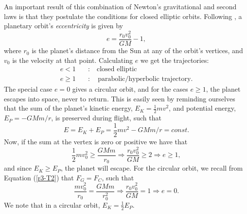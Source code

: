 \documentclass[]{article}
\begin{document}
An important result of this combination of Newton's gravitational and second laws is that they postulate the conditions for closed elliptic orbits. Following \cite{hibbeler2001}, a planetary orbit's \textit{eccentricity} is given by
\begin{equation}
	e = \frac{r_0 v_0^2}{GM} - 1,
\end{equation}
where $r_0$ is the planet's distance from the Sun at any of the orbit's vertices, and $v_0$ is the velocity at that point. Calculating $e$ we get the trajectories:
\begin{equation}
\begin{aligned}
	e < 1 \quad &: \quad \text{closed elliptic} \\
	e \ge 1 \quad &: \quad \text{parabolic/hyperbolic trajectory}.
\end{aligned}
\end{equation}
The special case $e=0$ gives a circular orbit, and for the cases $e \ge 1$, the planet escapes into space, never to return. This is easily seen by reminding ourselves that the sum of the planet's kinetic energy, $E_K=\frac{1}{2}mv^2$, and potential energy, $E_P=-GMm/r$, is preserved during flight, such that
\begin{equation}
E = E_K + E_P = \frac{1}{2}mv^2 - GMm/r = const.
\end{equation}
Now, if the sum at the vertex is zero or positive we have that
\begin{equation}
	\frac{1}{2}mv_0^2 \ge \frac{GMm}{r_0} \Rightarrow \frac{r_0v_0^2}{GM} \ge 2 \Rightarrow e \ge 1,
\end{equation}
and since $E_K \ge E_P$, the planet will escape. For the circular orbit, we recall from Equation (\ref{r3-T2}) that $F_G = F_C$, such that
\begin{equation} \label{e=0}
	\frac{mv_0^2}{r_0} = \frac{GMm}{r_0^2} \Rightarrow \frac{r_0 v_0^2}{GM} = 1 \Rightarrow e = 0.
\end{equation}
We note that in a circular orbit, $E_K = \frac{1}{2} E_P$.
\end{document}
